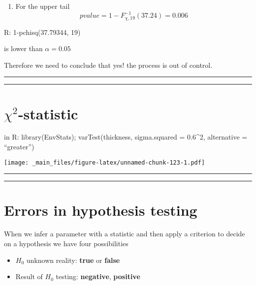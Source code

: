 \documentclass[
]{book}
\providecommand{\tightlist}{%
  \setlength{\itemsep}{0pt}\setlength{\parskip}{0pt}}
\begin{document}
\begin{enumerate}
\def\labelenumi{\arabic{enumi}.}
\setcounter{enumi}{1}
\tightlist
\item
  For the upper tail \[pvalue=1-F_{\chi,19}^{-1}(37.24)= 0.006\]
\end{enumerate}

R: 1-pchisq(37.79344, 19)

is lower than \(\alpha=0.05\)

Therefore we need to conclude that yes! the process is out of control.

\begin{center}\rule{0.5\linewidth}{0.5pt}\end{center}

\begin{center}\rule{0.5\linewidth}{0.5pt}\end{center}

\hypertarget{chi2-statistic-3}{%
\section{\texorpdfstring{\(\chi^2\)-statistic}{\textbackslash chi\^{}2-statistic}}\label{chi2-statistic-3}}

in R: library(EnvStats);
varTest(thickness, sigma.squared = 0.6\^{}2, alternative = ``greater'')

\texttt{[image: \_main\_files/figure-latex/unnamed-chunk-123-1.pdf]}

\begin{center}\rule{0.5\linewidth}{0.5pt}\end{center}

\begin{center}\rule{0.5\linewidth}{0.5pt}\end{center}

\hypertarget{errors-in-hypothesis-testing}{%
\section{Errors in hypothesis testing}\label{errors-in-hypothesis-testing}}

When we infer a parameter with a statistic and then apply a criterion to decide on a hypothesis we have four possibilities

\begin{itemize}
\tightlist
\item
  \(H_0\) unknown reality: \textbf{true} or \textbf{false}
\item
  Result of \(H_0\) testing: \textbf{negative}, \textbf{positive}
\end{itemize}
\end{document}
